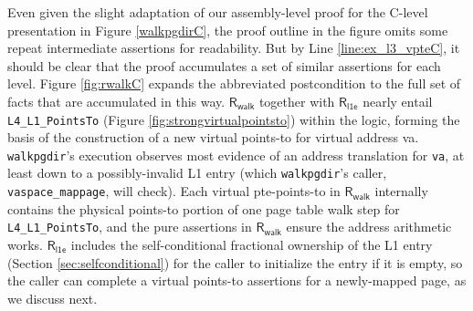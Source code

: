 Even given the slight adaptation of our assembly-level proof for the C-level presentation in Figure \ref{walkpgdirC},
the proof outline in the figure omits some repeat intermediate assertions for readability.
But by Line \ref{line:ex_l3_vpteC}, it should be clear that the proof accumulates a set of similar assertions for each level.
Figure \ref{fig:rwalkC} expands the abbreviated postcondition to the full set of facts that are accumulated in this way.
$\mathsf{R}_\mathsf{walk}$ together with $\mathsf{R}_{\mathsf{l1e}}$
nearly entail \lstinline|L4_L1_PointsTo| (Figure \ref{fig:strongvirtualpointsto}) within the logic,
forming the basis of the construction of a new virtual points-to for virtual address \textsf{va}.
\lstinline|walkpgdir|'s execution observes most evidence of an address translation for \lstinline|va|,
at least down to a possibly-invalid L1 entry (which \lstinline|walkpgdir|'s caller, \lstinline|vaspace_mappage|, will check). 
Each virtual pte-points-to in $\mathsf{R}_\mathsf{walk}$ internally contains the physical points-to portion of one page table walk step for \lstinline|L4_L1_PointsTo|,
and the pure assertions in $\mathsf{R}_\mathsf{walk}$ ensure the address arithmetic works.
$\mathsf{R}_{\mathsf{l1e}}$ includes the self-conditional fractional ownership of the L1 entry (Section \ref{sec:selfconditional})
for the caller to initialize the entry if it is empty, so the caller can complete a virtual points-to assertions
for a newly-mapped page, as we discuss next.



